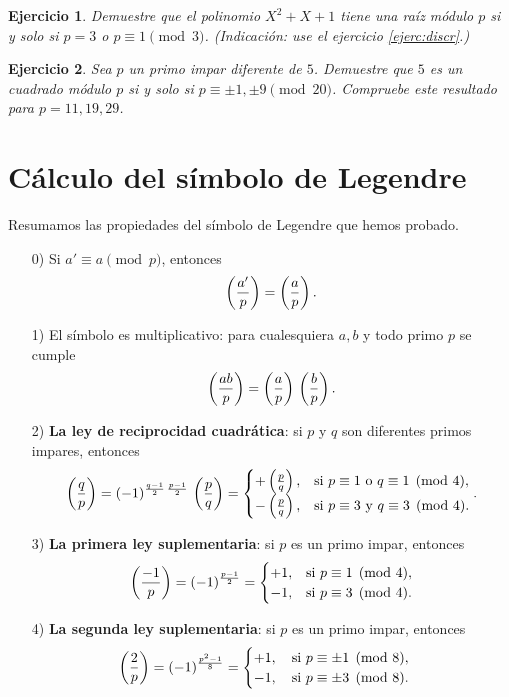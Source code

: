 \documentclass{article}
\theoremstyle{plain}
\newtheorem{ejerc}{Ejercicio}
\begin{document}
\begin{ejerc}
  Demuestre que el polinomio $X^2 + X + 1$ tiene una raíz módulo $p$ si y solo
  si $p = 3$ o $p \equiv 1 \pmod{3}$. (Indicación: use el ejercicio
  \ref{ejerc:discr}.)
\end{ejerc}

\begin{ejerc}
  Sea $p$ un primo impar diferente de $5$. Demuestre que $5$ es un cuadrado
  módulo $p$ si y solo si $p \equiv \pm 1, \pm 9 \pmod{20}$. Compruebe este
  resultado para $p = 11, 19, 29$.
\end{ejerc}


\section{Cálculo del símbolo de Legendre}

Resumamos las propiedades del símbolo de Legendre que hemos probado.

\begin{enumerate}
\item[0)] Si $a' \equiv a \pmod{p}$, entonces
  $$\left(\frac{a'}{p}\right) = \left(\frac{a}{p}\right).$$

\item[1)] El símbolo es multiplicativo: para cualesquiera $a,b$ y todo primo $p$
  se cumple
  $$\left(\frac{ab}{p}\right) = \left(\frac{a}{p}\right)\,\left(\frac{b}{p}\right).$$

\item[2)] \textbf{La ley de reciprocidad cuadrática}: si $p$ y $q$ son
  diferentes primos impares, entonces
  $$\left(\frac{q}{p}\right) = (-1)^{\frac{q-1}{2}\,\frac{p-1}{2}}\,\left(\frac{p}{q}\right) = \begin{cases}
+\left(\frac{p}{q}\right), & \text{si }p\equiv 1\text{ o }q\equiv 1 \pmod{4},\\
-\left(\frac{p}{q}\right), & \text{si } p\equiv 3\text{ y }q\equiv 3 \pmod{4}.
\end{cases}.$$

\item[3)] \textbf{La primera ley suplementaria}: si $p$ es un primo impar, entonces
\[ \left(\frac{-1}{p}\right) = (-1)^{\frac{p-1}{2}} = \begin{cases}
    +1, & \text{si }p \equiv 1 \pmod{4},\\
    -1, & \text{si }p \equiv 3 \pmod{4}.
  \end{cases} \]

\item[4)] \textbf{La segunda ley suplementaria}: si $p$ es un primo impar, entonces
  \[ \left(\frac{2}{p}\right) = (-1)^{\frac{p^2-1}{8}} = \begin{cases}
      +1, \quad \text{si }p \equiv \pm 1 \pmod{8},\\
      -1, \quad \text{si }p \equiv \pm 3 \pmod{8}.
    \end{cases} \]
\end{enumerate}
\end{document}
